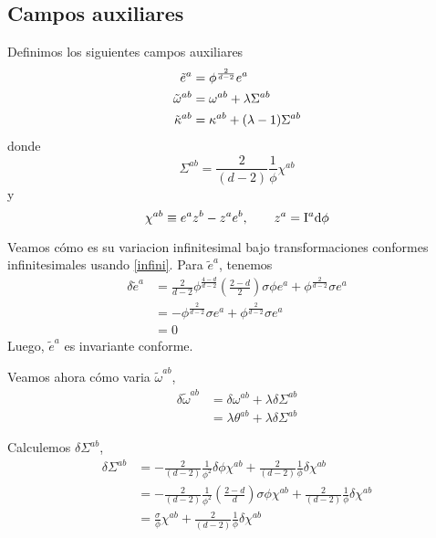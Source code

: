 \subsection{Campos auxiliares}
Definimos los siguientes campos auxiliares
\begin{align}
    \Tilde{e}^{a}&=\phi^\frac{2}{d-2} e^{a}\\
    \Tilde{\omega}^{ab}&=\omega^{ab}+\lambda\Sigma ^{ab}\\
    \Tilde{\kappa}^{ab}&=\kappa^{ab}+(\lambda-1)\Sigma ^{ab}
\end{align}
donde 
\begin{equation}
  \Sigma^{ab}=\frac{2}{(d-2)}\frac{1}{\phi}\chi^{ab}
\end{equation}
y
\begin{equation}
  \chi^{ab}\equiv e^{a}z^b-z^{a}e^b,\qquad z^{a}=\mathrm{I}^{a}\dd\phi
\end{equation}



Veamos cómo es su variacion infinitesimal bajo transformaciones conformes infinitesimales usando \eqref{infini}. Para $\tilde{e}^{a}$, tenemos
\begin{align}
  \delta \tilde{e}^{a}&=\frac{2}{d-2}\phi^\frac{4-d}{d-2}\left(\frac{2-d}{2}\right)\sigma\phi e^{a}+\phi^\frac{2}{d-2}\sigma e^{a}\\
  &=-\phi^\frac{2}{d-2}\sigma e^{a}+\phi^\frac{2}{d-2}\sigma e^{a}\\
  &=0
\end{align}
Luego, $\tilde{e}^{a}$ es invariante conforme.

Veamos ahora cómo varia $\tilde{\omega}^{ab}$,
\begin{align}
  \delta\tilde{\omega}^{ab}&=\delta \omega^{ab}+\lambda\delta\Sigma^{ab}\\
  &=\lambda\theta^{ab}+\lambda\delta\Sigma^{ab}\label{d omega}
\end{align}

Calculemos $\delta\Sigma^{ab}$,
\begin{align}
  \delta\Sigma^{ab}&=-\frac{2}{(d-2)}\frac{1}{\phi^2}\delta\phi \chi^{ab}+\frac{2}{(d-2)}\frac{1}{\phi}\delta\chi^{ab}\\
  &=-\frac{2}{(d-2)}\frac{1}{\phi^2}\left(\frac{2-d}{d}\right)\sigma\phi\chi^{ab}+\frac{2}{(d-2)}\frac{1}{\phi}\delta\chi^{ab}\\
  &=\frac{\sigma}{\phi}\chi^{ab}+\frac{2}{(d-2)}\frac{1}{\phi}\delta\chi^{ab}\label{d sigma}
\end{align}

